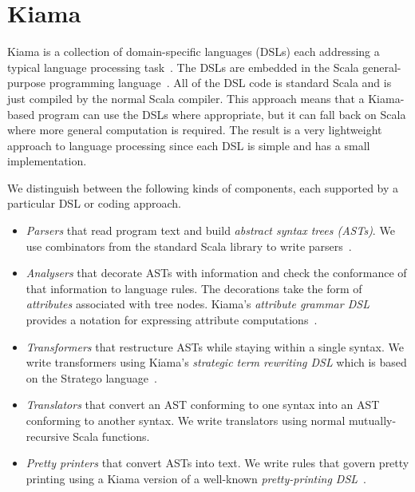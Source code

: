 \section{Kiama}

Kiama is a collection of domain-specific languages (DSLs) each addressing a typical language processing task~\cite{Sloane11}.
The DSLs are embedded in the Scala general-purpose programming language~\cite{Odersky10d}.
All of the DSL code is standard Scala and is just compiled by the normal Scala compiler.
This approach means that a Kiama-based program can use the DSLs where appropriate, but it can fall back on Scala where more general computation is required.
The result is a very lightweight approach to language processing since each DSL is simple and has a small implementation.

We distinguish between the following kinds of components, each supported by a particular DSL or coding approach.

\begin{itemize}

\item \emph{Parsers} that read program text and build \emph{abstract syntax trees (ASTs)}.
We use combinators from the standard Scala library to write parsers~\cite[chapter 33]{Odersky10d}.

\item \emph{Analysers} that decorate ASTs with information and check the conformance of that information to language rules.
The decorations take the form of \emph{attributes} associated with tree nodes.
Kiama's \emph{attribute grammar DSL} provides a notation for expressing attribute computations~\cite{Sloane12}.

\item \emph{Transformers} that restructure ASTs while staying within a single syntax.
We write transformers using Kiama's \emph{strategic term rewriting DSL} which is based on the Stratego language~\cite{Visser04,Visser07a}.

\item \emph{Translators} that convert an AST conforming to one syntax into an AST conforming to another syntax.
We write translators using normal mutually-recursive Scala functions.

\item \emph{Pretty printers} that convert ASTs into text.
We write rules that govern pretty printing using a Kiama version of a well-known \emph{pretty-printing DSL}~\cite{Swierstra08a}.

\end{itemize}

